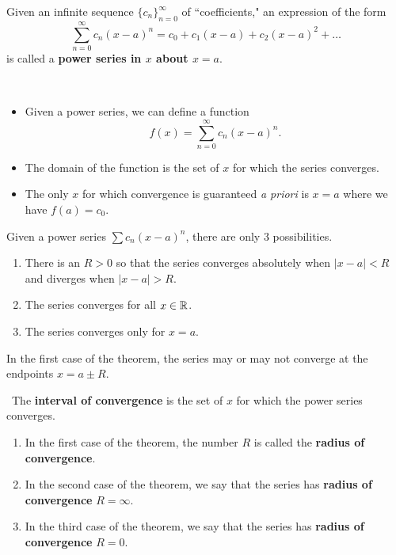 

\begin{definition}
Given an infinite sequence $\{c_n\}_{n=0}^\infty$ of ``coefficients," an expression of the form
\begin{equation*}
\sum_{n=0}^\infty c_n(x-a)^n = c_0 + c_1(x-a) + c_2(x-a)^2+\dots
\end{equation*}
is called a \textbf{power series in $x$ about $x=a$}.
\end{definition}

\begin{remark}\,
\begin{itemize}
\item Given a power series, we can define a function
\begin{equation*}
f(x) = \sum_{n=0}^\infty c_n(x-a)^n.
\end{equation*}
\item The domain of the function is the set of $x$ for which the series converges.
\item The only $x$ for which convergence is guaranteed \textit{a priori} is $x=a$ where we have $f(a)=c_0$.
\end{itemize}
\end{remark}

\vfill

\begin{theorem}
Given a power series $\sum c_n(x-a)^n$, there are only 3 possibilities.
\begin{enumerate}
\item There is an $R>0$ so that the series converges absolutely when $|x-a|<R$ and diverges when $|x-a|>R$.
\item The series converges for all $x\in\mathbb R$.
\item The series converges only for $x=a$.
\end{enumerate}
\end{theorem}

\begin{remark}
In the first case of the theorem, the series may or may not converge at the endpoints $x=a\pm R$.
\end{remark}

\begin{definition}\,
The \textbf{interval of convergence} is the set of $x$ for which the power series converges.
\begin{enumerate}
\item In the first case of the theorem, the number $R$ is called the \textbf{radius of convergence}.
\item In the second case of the theorem, we say that the series has \textbf{radius of convergence} $R=\infty$.
\item In the third case of the theorem, we say that the series has \textbf{radius of convergence} $R=0$.
\end{enumerate}
\end{definition}

